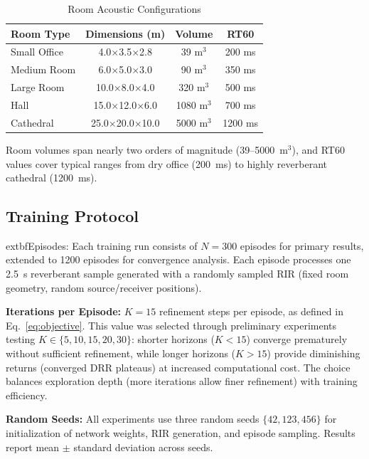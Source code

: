\documentclass[12pt,a4paper]{article}
\begin{document}
\begin{table}[t]
\centering
\caption{Room Acoustic Configurations}
\label{tab:room_config}
\small
\begin{tabular}{@{}lccc@{}}
\toprule
\textbf{Room Type} & \textbf{Dimensions (m)} & \textbf{Volume} & \textbf{RT60} \\
\midrule
Small Office & 4.0$\times$3.5$\times$2.8 & 39 m$^3$ & 200 ms \\
Medium Room & 6.0$\times$5.0$\times$3.0 & 90 m$^3$ & 350 ms \\
Large Room & 10.0$\times$8.0$\times$4.0 & 320 m$^3$ & 500 ms \\
Hall & 15.0$\times$12.0$\times$6.0 & 1080 m$^3$ & 700 ms \\
Cathedral & 25.0$\times$20.0$\times$10.0 & 5000 m$^3$ & 1200 ms \\
\bottomrule
\end{tabular}
\end{table}

Room volumes span nearly two orders of magnitude (39--5000~m$^3$), and RT60 values cover typical ranges from dry office (200~ms) to highly reverberant cathedral (1200~ms).

\subsection{Training Protocol}

            extbf{Episodes:} Each training run consists of $N=300$ episodes for primary results, extended to 1200 episodes for convergence analysis. Each episode processes one 2.5~s reverberant sample generated with a randomly sampled RIR (fixed room geometry, random source/receiver positions).

\textbf{Iterations per Episode:} $K=15$ refinement steps per episode, as defined in Eq.~\eqref{eq:objective}. This value was selected through preliminary experiments testing $K \in \{5, 10, 15, 20, 30\}$: shorter horizons ($K<15$) converge prematurely without sufficient refinement, while longer horizons ($K>15$) provide diminishing returns (converged DRR plateaus) at increased computational cost. The choice balances exploration depth (more iterations allow finer refinement) with training efficiency.

\textbf{Random Seeds:} All experiments use three random seeds $\{42, 123, 456\}$ for initialization of network weights, RIR generation, and episode sampling. Results report mean $\pm$ standard deviation across seeds.
\end{document}
